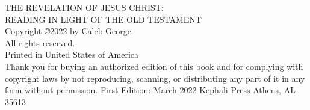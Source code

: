 \pagestyle{empty}
\frontmatter


\titleGM

\clearpage

\begin{vplace}[2]
\noindent
THE REVELATION OF JESUS CHRIST: \\READING IN LIGHT OF THE OLD TESTAMENT\\
\newline
Copyright \copyright 2022 by Caleb George\\
All rights reserved.\\
\newline
Printed in United States of America\\
\newline
Thank you for buying an authorized edition of this book and for complying with copyright laws by not reproducing, scanning, or distributing any part of it in any form without permission.
\newline
\newline
First Edition: March 2022
\newline
\newline
Kephali Press
\newline
Athens, AL 35613
\end{vplace}

\clearpage
\clearpage

\dedication
\clearpage


